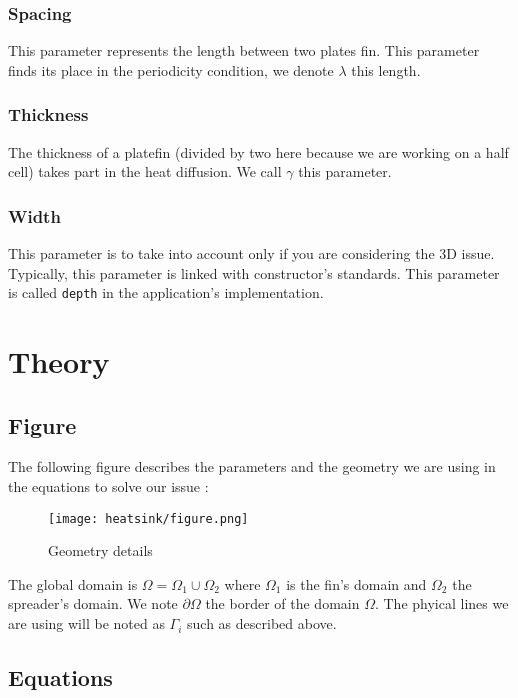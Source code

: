 \subsubsection{Spacing}
This parameter represents the length between two plates fin. This parameter finds its place in the periodicity condition, we denote $\lambda$ this length.

\subsubsection{Thickness}
The thickness of a platefin (divided by two here because we are working on a half cell) takes part in the heat diffusion. We call $\gamma$ this parameter.

\subsubsection{Width}

This parameter is to take into account only if you are considering the 3D issue. Typically, this parameter is linked with constructor's standards. This parameter is called \lstinline!depth! in the application's implementation.


\section{Theory}
\label{therm:equations}

\subsection{Figure}
The following figure describes the parameters and the geometry we are using in the equations to solve our issue :
\begin{figure}[!h]
\centering
\texttt{[image: heatsink/figure.png]}
\caption{Geometry details}
\end{figure}

The global domain is $\varOmega = \varOmega_1 \cup \varOmega_2 $ where $\varOmega_1$ is the fin's domain and $\varOmega_2$ the spreader's domain. We note $\partial\varOmega$ the border of the domain $\varOmega$. The phyical lines we are using will be noted as $\Gamma_i$ such as described above.


\subsection{Equations}

